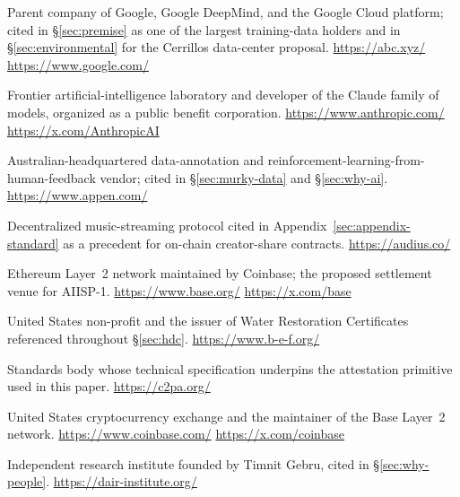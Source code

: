 \documentclass[10pt,a4paper,twocolumn]{article}
\begin{document}
\begin{description}\setlength{\itemsep}{2pt plus 0.5pt}

\item[Alphabet / Google.] Parent company of Google, Google DeepMind, and the Google Cloud platform; cited in \S\ref{sec:premise} as one of the largest training-data holders and in \S\ref{sec:environmental} for the Cerrillos data-center proposal. \url{https://abc.xyz/} \quad \url{https://www.google.com/}

\item[Anthropic.] Frontier artificial-intelligence laboratory and developer of the Claude family of models, organized as a public benefit corporation. \url{https://www.anthropic.com/} \quad \url{https://x.com/AnthropicAI}

\item[Appen.] Australian-headquartered data-annotation and reinforcement-learning-from-human-feedback vendor; cited in \S\ref{sec:murky-data} and \S\ref{sec:why-ai}. \url{https://www.appen.com/}

\item[Audius.] Decentralized music-streaming protocol cited in Appendix~\ref{sec:appendix-standard} as a precedent for on-chain creator-share contracts. \url{https://audius.co/}

\item[Base.] Ethereum Layer~2 network maintained by Coinbase; the proposed settlement venue for AIISP-1. \url{https://www.base.org/} \quad \url{https://x.com/base}

\item[Bonneville Environmental Foundation.] United States non-profit and the issuer of Water Restoration Certificates referenced throughout \S\ref{sec:hdc}. \url{https://www.b-e-f.org/}

\item[Coalition for Content Provenance and Authenticity.] Standards body whose technical specification underpins the attestation primitive used in this paper. \url{https://c2pa.org/}

\item[Coinbase.] United States cryptocurrency exchange and the maintainer of the Base Layer~2 network. \url{https://www.coinbase.com/} \quad \url{https://x.com/coinbase}

\item[Distributed AI Research Institute (DAIR).] Independent research institute founded by Timnit Gebru, cited in \S\ref{sec:why-people}. \url{https://dair-institute.org/}


\end{description}
\end{document}
